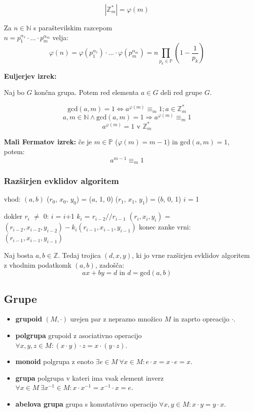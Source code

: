 \begin{multicols}{5}
\[ | \mathbb{Z}_m^* | = \varphi(m) \]

Za $n \in \mathbb{N}$ s paraštevilskim razcepom \\ $ n = p_1^{\alpha_1} \cdot ... \cdot p_m^{\alpha_m}$ velja:
\[\varphi(n) = \varphi(p_1^{\alpha_1}) \cdot ... \cdot \varphi(p_m^{\alpha_m}) = n \prod_{ p_k \in \mathbb{P}} \left(1-\frac{1}{p_k} \right) \]

\textbf{Euljerjev izrek:}

Naj bo $G$ končna grupa. Potem red elementa $a \in G$ deli red grupe $G$.

\[\textrm{gcd}(a, m) = 1 \Leftrightarrow a^{\varphi(m)} \equiv_m 1; a \in \mathbb{Z}_m^*\]
\[a,m \in \mathbb{N} \wedge \textrm{gcd}(a, m) = 1 \Rightarrow a^{\varphi(m)} \equiv_m 1\]
\[a^{\varphi(m)} = 1 \text{ v } \mathbb{Z}_m^*\]

\textbf{Mali Fermatov izrek:} če je $m \in \mathbb{P}$ ($\varphi(m) = m-1$) in $\textrm{gcd}(a,m) = 1$, potem:
\[a^{m-1} \equiv_m 1\]

\subsubsection*{Razširjen evklidov algoritem}

\begin{koda}
vhod: $(a, b)$
($r_0$, $x_0$, $y_0$) = ($a$, 1, 0)
($r_1$, $x_1$, $y_1$) = ($b$, 0, 1)
$i$ = 1

dokler $r_i$ $\neq$ 0:
    $i$ = $i$+1
    $k_i$ = $r_{i-2} // r_{i-1}$
    $(r_i, x_i, y_i)$ = $(r_{i-2}, x_{i-2}, y_{i-2}) - k_i(r_{i-1}, x_{i-1}, y_{i-1})$
konec zanke
vrni: $(r_{i-1}, x_{i-1}, y_{i-1})$
\end{koda}

Naj bosta $a, b \in \mathbb{Z}$. Tedaj trojica $(d, x, y)$, ki jo vrne razširjen evklidov algoritem z vhodnim podatkomk $(a, b)$, zadošča:
\[ax + by = d \text{ in } d = \textrm{gcd}(a, b)\] 


\subsection*{Grupe}
\begin{itemize}
    \item \textbf{grupoid} $(M, \cdot)$ urejen par z neprazno množico $M$ in zaprto opreacijo $\cdot$.
    \item \textbf{polgrupa} grupoid z asociativno operacijo $ \forall x,y,z \in M : (x\cdot y)\cdot z = x\cdot (y\cdot z)$.
    \item \textbf{monoid} polgrupa z enoto $ \exists e \in M \ \forall x \in M : e\cdot x = x\cdot e = x$.
    \item \textbf{grupa} polgrupa v kateri ima vsak element inverz $ \forall x \in M \ \exists x^{-1} \in M : x\cdot x^{-1} = x^{-1}\cdot x = e$.
    \item \textbf{abelova grupa} grupa s komutativno operacijo $ \forall x,y \in M  : x\cdot y = y\cdot x$.
\end{itemize} 


\end{multicols}
